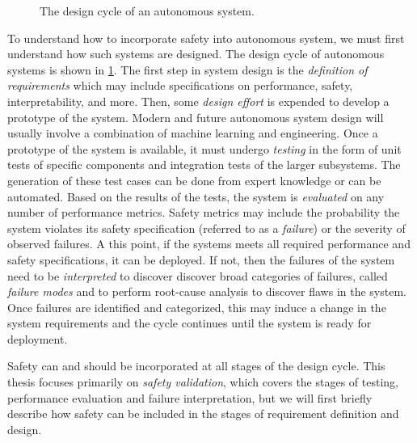\begin{figure}[!t]
\centering

\caption{The design cycle of an autonomous system.  }
\label{fig:design_cycle}
\end{figure}

To understand how to incorporate safety into autonomous system, we must first understand how such systems are designed. The design cycle of autonomous systems is shown in \cref{fig:design_cycle}. The first step in system design is the \emph{definition of requirements} which may include specifications on performance, safety, interpretability, and more. Then, some \emph{design effort} is expended to develop a prototype of the system. Modern and future autonomous system design will usually involve a combination of machine learning and engineering. Once a prototype of the system is available, it must undergo \emph{testing} in the form of unit tests of specific components and integration tests of the larger subsystems. The generation of these test cases can be done from expert knowledge or can be automated. Based on the results of the tests, the system is \emph{evaluated} on any number of performance metrics. Safety metrics may include the probability the system violates its safety specification (referred to as a \emph{failure}) or the severity of observed failures. A this point, if the systems meets all required performance and safety specifications, it can be deployed. If not, then the failures of the system need to be \emph{interpreted} to discover discover broad categories of failures, called \emph{failure modes} and to perform root-cause analysis to discover flaws in the system. Once failures are identified and categorized, this may induce a change in the system requirements and the cycle continues until the system is ready for deployment. 


Safety can and should be incorporated at all stages of the design cycle. This thesis focuses primarily on \emph{safety validation}, which covers the stages of testing, performance evaluation and failure interpretation, but we will first briefly describe how safety can be included in the stages of requirement definition and design. 

